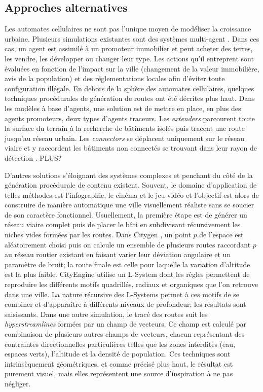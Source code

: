 \documentclass[10pt]{article}
\begin{document}
\subsection{Approches alternatives}

Les automates cellulaires ne sont pas l'unique moyen de modéliser la
croissance urbaine. Plusieurs simulations existantes sont des systèmes
multi-agent \cite{Lechnera,Lechner2004}. Dans ces cas, un agent est
assimilé à un promoteur immobilier et peut acheter des terres, les
vendre, les développer ou changer leur type. Les actions qu'il
entreprent sont évaluées en fonction de l'impact sur la ville
(changement de la valeur immobilière, avis de la population) et des
réglementations locales afin d'éviter toute configuration illégale.
En dehors de la sphère des automates cellulaires, quelques techniques
procédurales de génération de routes ont été décrites plus haut. Dans
les modèles à base d'agents, une solution est de mettre en place, en
plus des agents promoteurs, deux types d'agents traceurs. Les
\textit{extenders} parcourent toute la surface du terrain à la
recherche de bâtiments isolés puis tracent une route jusqu'au réseau
urbain. Les \textit{connectors} se déplacent uniquement sur le réseau
viaire et y raccordent les bâtiments non connectés se trouvant dans
leur rayon de détection \cite{Lechnera}. PLUS?

D'autres solutions s'éloignant des systèmes complexes et penchant du
côté de la génération procédurale de contenu existent. Souvent, le
domaine d'application de telles méthodes est l'infographie, le cinéma
et le jeu vidéo et l'objectif est alors de construire de manière
automatique une ville visuellement réaliste sans se soucier de son
caractère fonctionnel. Usuellement, la première étape est de générer
un réseau viaire complet puis de placer le bâti en subdivisant
récursivement les niches vides formées par les routes. Dans Citygen
\cite{Kelly2007}, un point $p$ de l'espace est aléatoirement choisi
puis on calcule un ensemble de plusieurs routes raccordant $p$ au
réseau routier existant en faisant varier leur déviation angulaire et
un paramètre de bruit; la route finale est celle pour laquelle la
variation d'altitude est la plus faible. CityEngine \cite{Parish2001}
utilise un L-System dont les règles permettent de reproduire les
différents motifs quadrillés, radiaux et organiques que l'on retrouve
dans une ville. La nature récursive des L-Systems permet à ces motifs
de se combiner et d'apparaître à différents niveaux de profondeur; les
résultats sont saisissants. Dans une autre simulation, le tracé des
routes suit les \textit{hyperstreamlines} \cite{Chen2008} formées par
un champ de vecteurs. Ce champ est calculé par combinaison de
plusieurs autres champs de vecteurs, chacun représentant des
contraintes directionnelles particulières telles que les zones
interdites (eau, espaces verts), l'altitude et la densité de
population. Ces techniques sont intrinsèquement géométriques, et comme
précisé plus haut, le résultat est purement visuel, mais elles
représentent une source d'inspiration à ne pas négliger.
\end{document}
